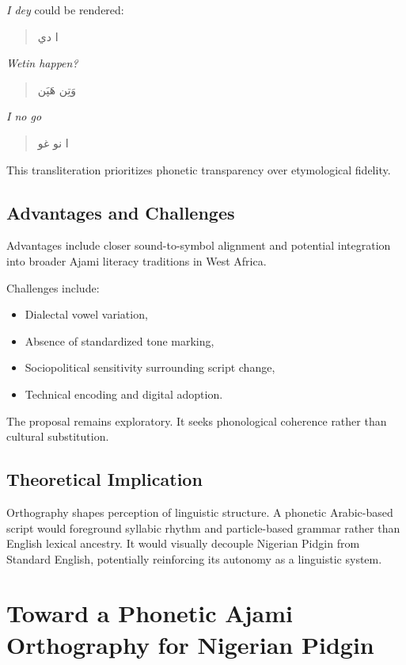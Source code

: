 \documentclass[12pt]{article}
\begin{document}
\textit{I dey} could be rendered:

\begin{quote}
ا دي
\end{quote}

\textit{Wetin happen?}

\begin{quote}
وَتِن هَپَن
\end{quote}

\textit{I no go}

\begin{quote}
ا نو غو
\end{quote}

This transliteration prioritizes phonetic transparency over etymological fidelity.

\subsection{Advantages and Challenges}

Advantages include closer sound-to-symbol alignment and potential integration into broader Ajami literacy traditions in West Africa.

Challenges include:

\begin{itemize}
\item Dialectal vowel variation,
\item Absence of standardized tone marking,
\item Sociopolitical sensitivity surrounding script change,
\item Technical encoding and digital adoption.
\end{itemize}

The proposal remains exploratory. It seeks phonological coherence rather than cultural substitution.

\subsection{Theoretical Implication}

Orthography shapes perception of linguistic structure. A phonetic Arabic-based script would foreground syllabic rhythm and particle-based grammar rather than English lexical ancestry. It would visually decouple Nigerian Pidgin from Standard English, potentially reinforcing its autonomy as a linguistic system.

\section{Toward a Phonetic Ajami Orthography for Nigerian Pidgin}
\end{document}
